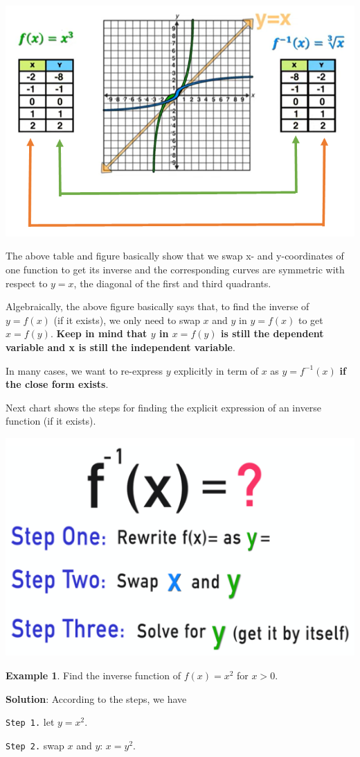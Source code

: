 \documentclass[
]{book}
\begin{document}
\begin{center}\includegraphics[width=0.6\linewidth]{img04/w04-InvFunDemo} \end{center}

The above table and figure basically show that we swap x- and y-coordinates of one function to get its inverse and the corresponding curves are symmetric with respect to \(y = x\), the diagonal of the first and third quadrants.

Algebraically, the above figure basically says that, to find the inverse of \(y = f(x)\) (if it exists), we only need to swap \(x\) and \(y\) in \(y = f(x)\) to get \(x = f(y)\). \textbf{\color{red}Keep in mind that \(y\) in \(x = f(y)\) is still the dependent variable and x is still the independent variable}.

In many cases, we want to re-express \(y\) explicitly in term of \(x\) as \(y = f^{-1}(x)\) \textbf{\color{red}if the close form exists}.

Next chart shows the steps for finding the explicit expression of an inverse function (if it exists).

\begin{center}\includegraphics[width=0.45\linewidth]{img04/w04-inverseFun} \end{center}

\textbf{Example 1}. Find the inverse function of \(f(x) = x^2\) for \(x > 0\).

\textbf{Solution}: According to the steps, we have

\texttt{Step\ 1.} let \(y = x^2\).

\texttt{Step\ 2.} swap \(x\) and \(y\): \(x = y^2\).
\end{document}

